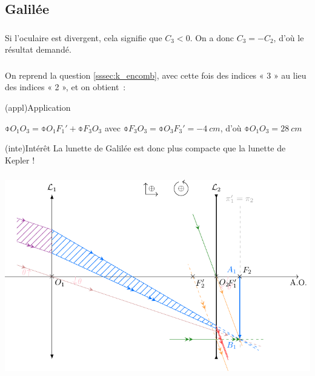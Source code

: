 \documentclass[../../main/main.tex]{subfiles}
\begin{document}
{\begin{tcbraster}[raster columns=6, raster equal height=rows]
	\end{tcbraster}

	\subsection{Galilée}

	\subsubsection{}
	Si l'oculaire est divergent, cela signifie que $C_3 < 0$. On a donc $C_3 = -
		C_2$, d'où le résultat demandé.

	\subsubsection{}
	On reprend la question \ref{sssec:k_encomb}, avec cette fois des indices « 3 »
	au lieu des indices « 2 », et on obtient~:

	\begin{tcbraster}[raster columns=2, raster equal height=rows]
		\begin{tcb}(appl){Application}

			$\obar{O_1O_3} = \obar{O_1F_1'} + \obar{F_3O_3}$ avec $\obar{F_3O_3} =
				\obar{O_3F_3'} = \SI{-4}{cm}$, d'où $\boxed{\obar{O_1O_3} =
					\SI{+28}{cm}}$

		\end{tcb}
		\begin{tcb}(inte){Intérêt}
			La lunette de Galilée est donc plus compacte que la lunette de Kepler !
		\end{tcb}
	\end{tcbraster}
	\vfill
	\subsubsection{}

	\begin{center}
		\includegraphics{galilee.pdf}
	\end{center}

}
\end{document}
